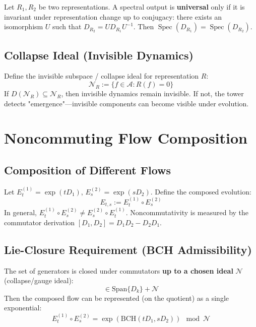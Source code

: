\documentclass[12pt, oneside]{article}
\DeclareMathOperator{\Spec}{Spec}
\newcommand{\N}{\mathcal{N}}
\begin{document}
Let $R_1, R_2$ be two representations. A spectral output is \textbf{universal} only if it is invariant under representation change up to conjugacy: there exists an isomorphism $U$ such that $D_{R_2} = U D_{R_1} U^{-1}$. Then $\Spec(D_{R_1}) = \Spec(D_{R_2})$.

\subsection{Collapse Ideal (Invisible Dynamics)}

Define the invisible subspace / collapse ideal for representation $R$:
\begin{equation}
\N_R := \{ f \in \mathcal{A} : R(f) = 0 \}
\end{equation}
If $D(\N_R) \subseteq \N_R$, then invisible dynamics remain invisible. If not, the tower detects "emergence"—invisible components can become visible under evolution.

\section{Noncommuting Flow Composition}

\subsection{Composition of Different Flows}

Let $E_t^{(1)} = \exp(tD_1)$, $E_s^{(2)} = \exp(sD_2)$. Define the composed evolution:
\begin{equation}
E_{t,s} := E_t^{(1)} \circ E_s^{(2)}
\end{equation}
In general, $E_t^{(1)} \circ E_s^{(2)} \neq E_s^{(2)} \circ E_t^{(1)}$. Noncommutativity is measured by the commutator derivation $[D_1, D_2] = D_1 D_2 - D_2 D_1$.

\subsection{Lie-Closure Requirement (BCH Admissibility)}

The set of generators is closed under commutators \textbf{up to a chosen ideal} $\N$ (collapse/gauge ideal):
\begin{equation}
[D_i, D_j] \in \text{Span}\{D_k\} + \N
\end{equation}
Then the composed flow can be represented (on the quotient) as a single exponential:
\begin{equation}
E_t^{(1)} \circ E_s^{(2)} = \exp(\text{BCH}(tD_1, sD_2)) \mod \N
\end{equation}
\end{document}
